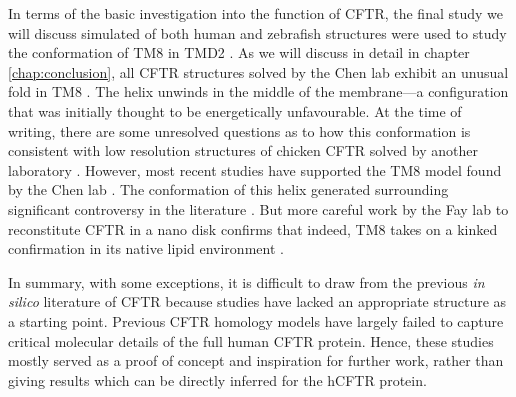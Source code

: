 
In terms of the basic investigation into the function of CFTR, the final study we will discuss simulated of both human and zebrafish structures were used to study the conformation of TM8 in TMD2 \cite{corradi2018}. As we will discuss in detail in chapter \ref{chap:conclusion}, all CFTR structures solved by the Chen lab exhibit an unusual fold in TM8 \cite{fiedorczuk2021, liu2017, liu2019, zhang2016, zhang2018a, zhang2017a}. The helix unwinds in the middle of the membrane---a configuration that was initially thought to be energetically unfavourable. At the time of writing, there are some unresolved questions as to how this conformation is consistent with low resolution structures of chicken CFTR solved by another laboratory \cite{fay2018}. However, most recent studies have supported the TM8 model found by the Chen lab \cite{corradi2018, negoda2019}. The conformation of this helix  generated surrounding significant controversy in the literature \cite{negoda2019, hegedus2022, infield2021, thomas2020}. But more careful work by the Fay lab to reconstitute CFTR in a nano disk confirms that indeed, TM8 takes on a kinked confirmation in its native lipid environment \cite{aleksandrov2022}.

In summary, with some exceptions, it is difficult to draw from the previous \textit{in silico} literature of CFTR because studies have lacked an appropriate structure as a starting point. Previous CFTR homology models have largely failed to capture critical molecular details of the full human CFTR protein. Hence, these studies mostly served as a proof of concept and inspiration for further work, rather than giving results which can be directly inferred for the hCFTR protein. 


